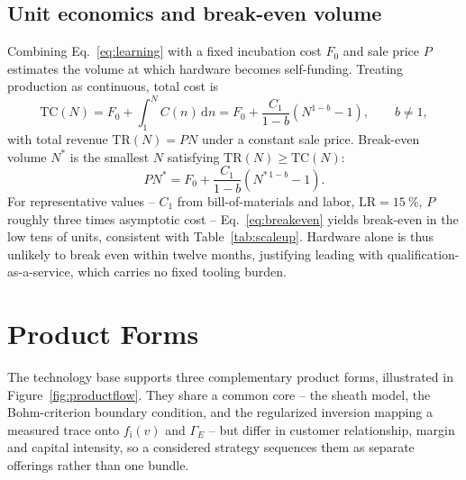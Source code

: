\subsection{Unit economics and break-even volume}

Combining Eq.~\eqref{eq:learning} with a fixed incubation cost $F_{0}$ and sale price $P$ estimates the volume at which hardware becomes self-funding. Treating production as continuous, total cost is
\begin{equation}
\mathrm{TC}(N) = F_{0} + \int_{1}^{N} C(n)\, \mathrm{d}n = F_{0} + \frac{C_{1}}{1-b}\left(N^{1-b} - 1\right), \qquad b \neq 1,
\label{eq:totalcost}
\end{equation}
with total revenue $\mathrm{TR}(N) = P N$ under a constant sale price. Break-even volume $N^{*}$ is the smallest $N$ satisfying $\mathrm{TR}(N) \geq \mathrm{TC}(N)$:
\begin{equation}
P N^{*} = F_{0} + \frac{C_{1}}{1-b}\left(N^{*\,1-b} - 1\right).
\label{eq:breakeven}
\end{equation}
For representative values -- $C_{1}$ from bill-of-materials and labor, $\mathrm{LR}=\SI{15}{\percent}$, $P$ roughly three times asymptotic cost -- Eq.~\eqref{eq:breakeven} yields break-even in the low tens of units, consistent with Table~\ref{tab:scaleup}. Hardware alone is thus unlikely to break even within twelve months, justifying leading with qualification-as-a-service, which carries no fixed tooling burden.

\section{Product Forms}
\label{sec:products}

The technology base supports three complementary product forms, illustrated in Figure~\ref{fig:productflow}. They share a common core -- the sheath model, the Bohm-criterion boundary condition, and the regularized inversion mapping a measured trace onto $f_{\mathrm{i}}(v)$ and $\Gamma_{E}$ -- but differ in customer relationship, margin and capital intensity, so a considered strategy sequences them as separate offerings rather than one bundle.

